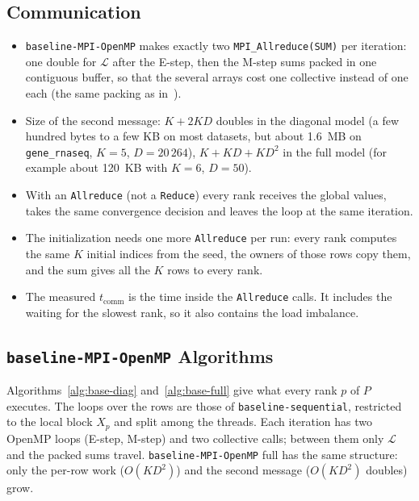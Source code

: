 \documentclass[conference,onecolumn]{IEEEtran}
\newcommand{\vseq}{\texttt{baseline-\allowbreak sequential}}
\newcommand{\vbase}{\texttt{baseline-\allowbreak MPI-\allowbreak OpenMP}}
\begin{document}
\subsection{Communication}
\begin{itemize}
\item \vbase{} makes exactly two \texttt{MPI\_Allreduce(SUM)} per iteration: one double for $\mathcal{L}$ after the E-step, then the M-step sums packed in one contiguous buffer, so that the several arrays cost one collective instead of one each (the same packing as in~\cite{byu}).
\item Size of the second message: $K+2KD$ doubles in the diagonal model (a few hundred bytes to a few KB on most datasets, but about 1.6~MB on \texttt{gene\_rnaseq}, $K=5$, $D=20\,264$), $K+KD+KD^2$ in the full model (for example about 120~KB with $K=6$, $D=50$).
\item With an \texttt{Allreduce} (not a \texttt{Reduce}) every rank receives the global values, takes the same convergence decision and leaves the loop at the same iteration.
\item The initialization needs one more \texttt{Allreduce} per run: every rank computes the same $K$ initial indices from the seed, the owners of those rows copy them, and the sum gives all the $K$ rows to every rank.
\item The measured $t_{\mathrm{comm}}$ is the time inside the \texttt{Allreduce} calls. It includes the waiting for the slowest rank, so it also contains the load imbalance.
\end{itemize}

\subsection{\texorpdfstring{\vbase}{baseline-MPI-OpenMP} Algorithms}
Algorithms~\ref{alg:base-diag} and~\ref{alg:base-full} give what every rank $p$ of $P$ executes. The loops over the rows are those of \vseq{}, restricted to the local block $X_p$ and split among the threads. Each iteration has two OpenMP loops (E-step, M-step) and two collective calls; between them only $\mathcal{L}$ and the packed sums travel. \vbase{} full has the same structure: only the per-row work ($O(KD^2)$) and the second message ($O(KD^2)$ doubles) grow.
\end{document}
